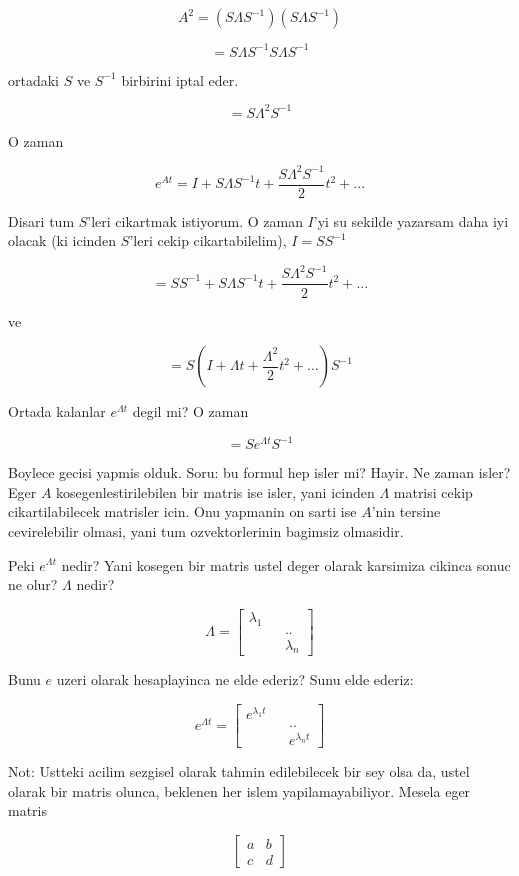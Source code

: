 \documentclass[12pt,fleqn]{article}\usepackage{../common}
\begin{document}
\[ A^2 = (S \Lambda S^{-1})(S \Lambda S^{-1}) \]

\[ = S \Lambda S^{-1}S \Lambda S^{-1} \]

ortadaki $S$ ve $S^{-1}$ birbirini iptal eder. 

\[ = S \Lambda^2 S^{-1} \]

O zaman 

\[ e^{At} = I + S \Lambda S^{-1} t + \frac{S \Lambda^2 S^{-1}}{2}t^2 + ...\]

Disari tum $S$'leri cikartmak istiyorum. O zaman $I$'yi su sekilde yazarsam
daha iyi olacak (ki icinden $S$'leri cekip cikartabilelim), $I = SS^{-1}$

\[ = SS^{-1} + S \Lambda S^{-1} t + \frac{S \Lambda^2 S^{-1}}{2}t^2 + ...\]

ve

\[ = S (I + \Lambda t + \frac{\Lambda^2}{2}t^2 + ...) S^{-1}\]

Ortada kalanlar $e^{\Lambda t}$ degil mi? O zaman

\[ = S e^{\Lambda t}S^{-1} \]

Boylece gecisi yapmis olduk. Soru: bu formul hep isler mi? Hayir. Ne zaman
isler? Eger $A$ kosegenlestirilebilen bir matris ise isler, yani icinden
$\Lambda$ matrisi cekip cikartilabilecek matrisler icin. Onu yapmanin on
sarti ise $A$'nin tersine cevirelebilir olmasi, yani tum ozvektorlerinin
bagimsiz olmasidir.

Peki $e^{\Lambda t}$ nedir? Yani kosegen bir matris ustel deger olarak
karsimiza cikinca sonuc ne olur? $\Lambda$ nedir?

\[ \Lambda =
\left[\begin{array}{ccc}
\lambda_1 && \\
&&.. \\
&& \lambda_n
\end{array}\right]
 \]

Bunu $e$ uzeri olarak hesaplayinca ne elde ederiz? Sunu elde ederiz:


\[ e^{\Lambda t} =
\left[\begin{array}{ccc}
e^{\lambda_1t} && \\
&&.. \\
&& e^{\lambda_n t}
\end{array}\right]
 \]

Not: Ustteki acilim sezgisel olarak tahmin edilebilecek bir sey olsa da,
ustel olarak bir matris olunca, beklenen her islem yapilamayabiliyor. Mesela 
eger matris

\[ 
\left[\begin{array}{cc}
a & b \\ c & d
\end{array}\right]
 \]
\end{document}
